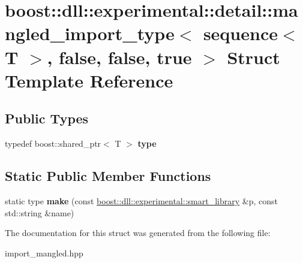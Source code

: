 \hypertarget{a01700}{}\section{boost\+:\+:dll\+:\+:experimental\+:\+:detail\+:\+:mangled\+\_\+import\+\_\+type$<$ sequence$<$ T $>$, false, false, true $>$ Struct Template Reference}
\label{a01700}
\subsection*{Public Types}
\begin{DoxyCompactItemize}
\item 
\mbox{\label{a01700_ade212675474fedf00b10222d999e9d6a}} 
typedef boost\+::shared\+\_\+ptr$<$ T $>$ {\bfseries type}
\end{DoxyCompactItemize}
\subsection*{Static Public Member Functions}
\begin{DoxyCompactItemize}
\item 
\mbox{\label{a01700_aba231392f132614d763cb0997c53cbcd}} 
static type {\bfseries make} (const \hyperlink{a01712}{boost\+::dll\+::experimental\+::smart\+\_\+library} \&p, const std\+::string \&name)
\end{DoxyCompactItemize}


The documentation for this struct was generated from the following file\+:\begin{DoxyCompactItemize}
\item 
import\+\_\+mangled.\+hpp\end{DoxyCompactItemize}
